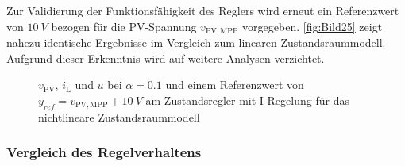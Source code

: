 Zur Validierung der Funktionsfähigkeit des Reglers wird erneut ein Referenzwert von $\SI{+10}{V}$ bezogen für die PV-Spannung $v_{\mathrm{PV,MPP}}$ vorgegeben. \autoref{fig:Bild25} zeigt nahezu identische Ergebnisse im Vergleich zum linearen Zustandsraummodell. Aufgrund dieser Erkenntnis wird auf weitere Analysen verzichtet.

\begin{figure}[H]
    \centering
    \caption[Validierung Regler mit I-Regelung (nichtlinear)]{$v_{\mathrm{PV}}$, $i_{\mathrm{L}}$ und $u$ bei $\alpha = 0.1$ und einem Referenzwert von $y_{ref} = v_{\mathrm{PV,MPP}} + \SI{10}{V}$ am Zustandsregler mit I-Regelung für das nichtlineare Zustandsraummodell}
    \label{fig:Bild25}
\end{figure}

\subsubsection{Vergleich des Regelverhaltens}

